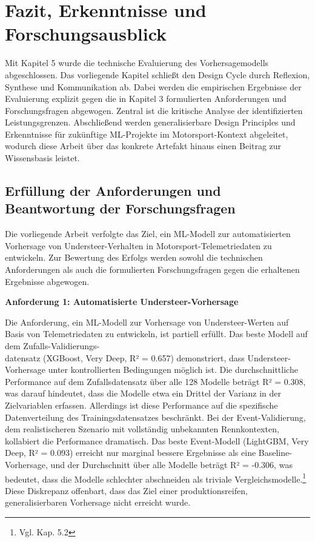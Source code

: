 \chapter{Fazit, Erkenntnisse und Forschungsausblick}
Mit Kapitel 5 wurde die technische Evaluierung des Vorhersagemodells abgeschlossen. Das vorliegende Kapitel schließt den Design Cycle durch Reflexion, Synthese und Kommunikation ab. Dabei werden die empirischen Ergebnisse der Evaluierung explizit gegen die in Kapitel 3 formulierten Anforderungen und Forschungsfragen abgewogen. Zentral ist die kritische Analyse der identifizierten Leistungsgrenzen. Abschließend werden generalisierbare Design Principles und Erkenntnisse für zukünftige ML-Projekte im Motorsport-Kontext abgeleitet, wodurch diese Arbeit über das konkrete Artefakt hinaus einen Beitrag zur Wissensbasis leistet.

\section{Erfüllung der Anforderungen und Beantwortung der Forschungsfragen}

Die vorliegende Arbeit verfolgte das Ziel, ein \ac{ML}-Modell zur automatisierten Vorhersage von Understeer-Verhalten in Motorsport-Telemetriedaten zu entwickeln. Zur Bewertung des Erfolgs werden sowohl die technischen Anforderungen als auch die formulierten Forschungsfragen gegen die erhaltenen Ergebnisse abgewogen.

\textbf{Anforderung 1: Automatisierte Understeer-Vorhersage}

Die Anforderung, ein \ac{ML}-Modell zur Vorhersage von Understeer-Werten auf Basis von Telemetriedaten zu entwickeln, ist partiell erfüllt. Das beste Modell auf dem Zufalls-Validierungs-\\datensatz (XGBoost, Very Deep, R² = 0.657) demonstriert, dass Understeer-Vorhersage unter kontrollierten Bedingungen möglich ist. Die durchschnittliche Performance auf dem Zufallsdatensatz über alle 128 Modelle beträgt R² = 0.308, was darauf hindeutet, dass die Modelle etwa ein Drittel der Varianz in der Zielvariablen erfassen. Allerdings ist diese Performance auf die spezifische Datenverteilung des Trainingsdatensatzes beschränkt. Bei der Event-Validierung, dem realistischeren Szenario mit vollständig unbekannten Rennkontexten, kollabiert die Performance dramatisch. Das beste Event-Modell (LightGBM, Very Deep, R² = 0.093) erreicht nur marginal bessere Ergebnisse als eine Baseline-Vorhersage, und der Durchschnitt über alle Modelle beträgt R² = -0.306, was bedeutet, dass die Modelle schlechter abschneiden als triviale Vergleichsmodelle.\footnote{Vgl. Kap. 5.2} Diese Diskrepanz offenbart, dass das Ziel einer produktionsreifen, generalisierbaren Vorhersage nicht erreicht wurde.

